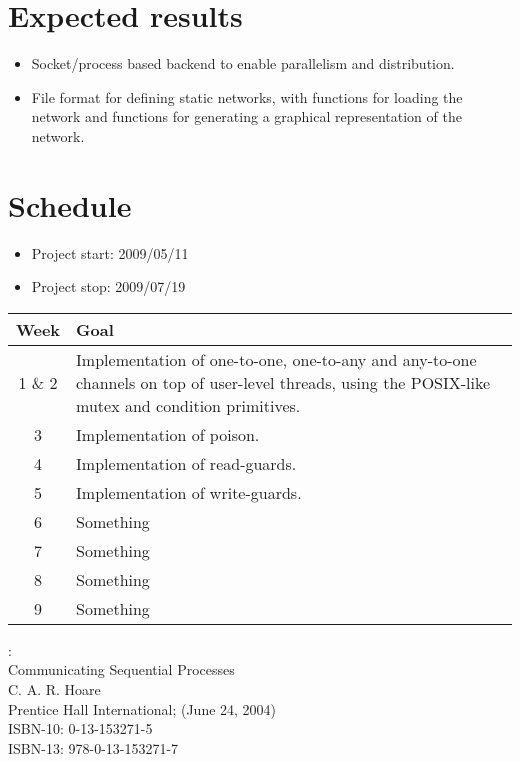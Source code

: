 \documentclass[a4paper,12pt]{article}
\begin{document}
\section*{Expected results}
\begin{itemize}
 \item Socket/process based backend to enable parallelism and distribution.
 \item File format for defining static networks, with functions for loading the 
   network and functions for generating a graphical representation of the 
   network. 
\end{itemize}

\section*{Schedule}
\begin{itemize}
 \item Project start: 2009/05/11
 \item Project stop: 2009/07/19
\end{itemize}

\begin{tabular}{|c|p{11.5cm}|}
    \hline
    Week & Goal\\
    \hline
    1 \& 2 & Implementation of one-to-one, one-to-any and any-to-one channels on
    top of user-level threads, using the POSIX-like mutex and condition
    primitives.\\
    \hline
    3 & Implementation of poison. \\
    \hline
    4 & Implementation of read-guards. \\
    \hline
    5 & Implementation of write-guards.  \\
    \hline
    6 & Something \\
    \hline
    7 & Something \\
    \hline
    8 & Something \\
    \hline
    9 & Something \\
    \hline
\end{tabular}


\begin{thebibliography}{99}

:\\
Communicating Sequential Processes\\
C. A. R. Hoare\\
Prentice Hall International; (June 24, 2004)\\
ISBN-10: 0-13-153271-5\\
ISBN-13: 978-0-13-153271-7

\end{thebibliography}
\end{document}
